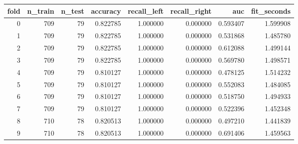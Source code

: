 \begin{tabular}{rrrrrrrr}
\toprule
fold & n_train & n_test & accuracy & recall_left & recall_right & auc & fit_seconds \\
\midrule
0 & 709 & 79 & 0.822785 & 1.000000 & 0.000000 & 0.593407 & 1.599908 \\
1 & 709 & 79 & 0.822785 & 1.000000 & 0.000000 & 0.531868 & 1.485780 \\
2 & 709 & 79 & 0.822785 & 1.000000 & 0.000000 & 0.612088 & 1.499144 \\
3 & 709 & 79 & 0.822785 & 1.000000 & 0.000000 & 0.569780 & 1.498571 \\
4 & 709 & 79 & 0.810127 & 1.000000 & 0.000000 & 0.478125 & 1.514232 \\
5 & 709 & 79 & 0.810127 & 1.000000 & 0.000000 & 0.552083 & 1.484085 \\
6 & 709 & 79 & 0.810127 & 1.000000 & 0.000000 & 0.518750 & 1.494933 \\
7 & 709 & 79 & 0.810127 & 1.000000 & 0.000000 & 0.522396 & 1.452348 \\
8 & 710 & 78 & 0.820513 & 1.000000 & 0.000000 & 0.497210 & 1.441839 \\
9 & 710 & 78 & 0.820513 & 1.000000 & 0.000000 & 0.691406 & 1.459563 \\
\bottomrule
\end{tabular}
